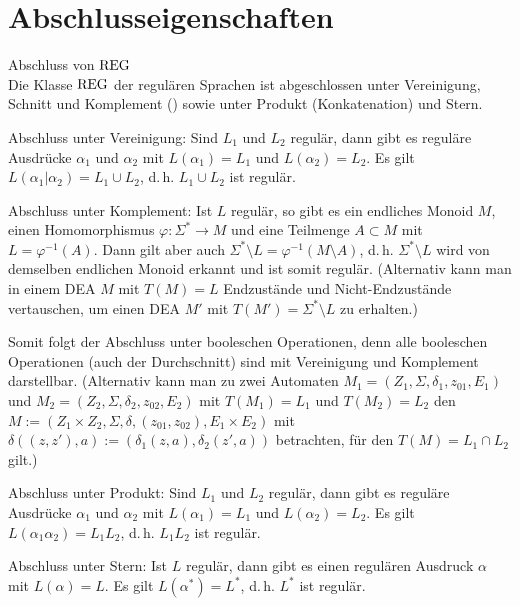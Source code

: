 \pagebreak

\section{%
    Abschlusseigenschaften%
}

\begin{Satz}{Abschluss von $\text{REG}$}\\
    Die Klasse $\text{REG}$ der regulären Sprachen ist abgeschlossen unter
    Vereinigung, Schnitt und Komplement
    () sowie unter
    Produkt (Konkatenation) und Stern.
\end{Satz}

\begin{Beweis}
    Abschluss unter Vereinigung:
    Sind $L_1$ und $L_2$ regulär,
    dann gibt es reguläre Ausdrücke $\alpha_1$ und $\alpha_2$ mit
    $L(\alpha_1) = L_1$ und $L(\alpha_2) = L_2$.
    Es gilt $L(\alpha_1 | \alpha_2) = L_1 \cup L_2$, d.\,h.
    $L_1 \cup L_2$ ist regulär.

    Abschluss unter Komplement:
    Ist $L$ regulär, so gibt es ein endliches Monoid $M$, einen
    Homomorphismus $\varphi\colon \Sigma^\ast \rightarrow M$
    und eine Teilmenge $A \subset M$ mit $L = \varphi^{-1}(A)$.
    Dann gilt aber auch
    $\Sigma^\ast \setminus L = \varphi^{-1}(M \setminus A)$,
    d.\,h. $\Sigma^\ast \setminus L$ wird von demselben endlichen Monoid
    erkannt und ist somit regulär.
    (Alternativ kann man in einem DEA $M$ mit $T(M) = L$ Endzustände und
    Nicht-Endzustände vertauschen, um einen DEA $M'$ mit
    $T(M') = \Sigma^\ast \setminus L$ zu erhalten.)

    Somit folgt der Abschluss unter booleschen Operationen,
    denn alle booleschen Operationen (auch der Durchschnitt) sind mit
    Vereinigung und Komplement darstellbar.
    (Alternativ kann man zu zwei Automaten
    $M_1 = (Z_1, \Sigma, \delta_1, z_{01}, E_1)$ und
    $M_2 = (Z_2, \Sigma, \delta_2, z_{02}, E_2)$ mit
    $T(M_1) = L_1$ und $T(M_2) = L_2$ den 
    $M := (Z_1 \times Z_2, \Sigma, \delta, (z_{01}, z_{02}), E_1 \times E_2)$
    mit $\delta((z, z'), a) := (\delta_1(z, a), \delta_2(z', a))$
    betrachten, für den $T(M) = L_1 \cap L_2$ gilt.)

    Abschluss unter Produkt:
    Sind $L_1$ und $L_2$ regulär,
    dann gibt es reguläre Ausdrücke $\alpha_1$ und $\alpha_2$ mit
    $L(\alpha_1) = L_1$ und $L(\alpha_2) = L_2$.
    Es gilt $L(\alpha_1 \alpha_2) = L_1 L_2$, d.\,h.
    $L_1 L_2$ ist regulär.

    Abschluss unter Stern:
    Ist $L$ regulär, dann gibt es einen regulären Ausdruck $\alpha$ mit
    $L(\alpha) = L$.
    Es gilt $L(\alpha^\ast) = L^\ast$, d.\,h. $L^\ast$ ist regulär.
\end{Beweis}

